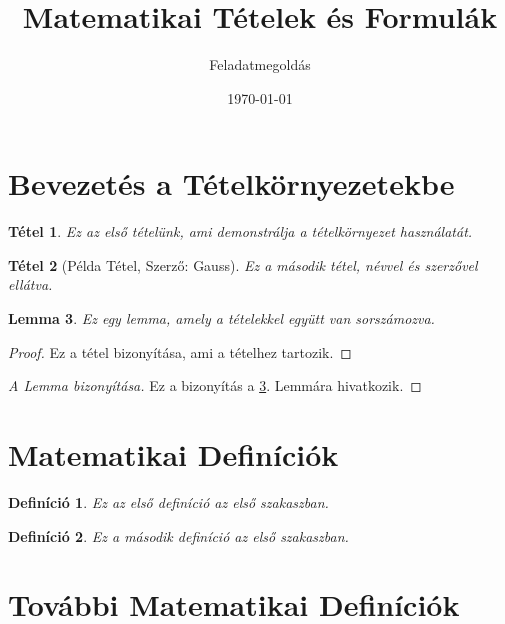 \documentclass[a4paper,12pt]{article}
\newtheorem{theorem}{Tétel}
\newtheorem{lemma}[theorem]{Lemma}
\newtheorem{definition}{Definíció}[section]
\begin{document}
\title{Matematikai Tételek és Formulák}
\author{Feladatmegoldás}
\date{\today}

\maketitle

\tableofcontents

\section{Bevezetés a Tételkörnyezetekbe}

\begin{theorem}
Ez az első tételünk, ami demonstrálja a tételkörnyezet használatát.
\end{theorem}

\begin{theorem}[Példa Tétel, Szerző: Gauss]
Ez a második tétel, névvel és szerzővel ellátva.
\end{theorem}

\begin{lemma}\label{lemma:1}
Ez egy lemma, amely a tételekkel együtt van sorszámozva.
\end{lemma}

\begin{proof}
Ez a tétel bizonyítása, ami a tételhez tartozik.
\end{proof}

\begin{proof}[A Lemma bizonyítása]
Ez a bizonyítás a \ref{lemma:1}. Lemmára hivatkozik.
\end{proof}

\section{Matematikai Definíciók}

\begin{definition}
Ez az első definíció az első szakaszban.
\end{definition}

\begin{definition}
Ez a második definíció az első szakaszban.
\end{definition}

\section{További Matematikai Definíciók}
\end{document}
